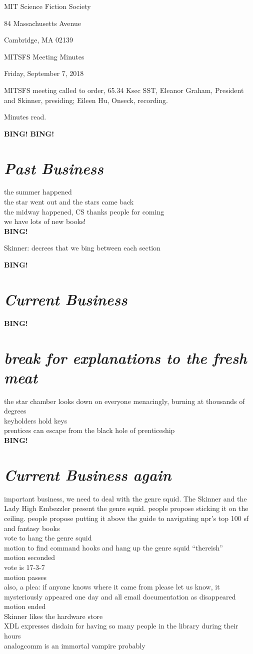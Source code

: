 \documentclass[10pt]{article}
\newcommand{\bing}{{\bf BING!} }
\newcommand{\goto}[1]{\bing \vskip 12pt \section*{{\em{#1}}}}
\newcommand{\skinner}{Eleanor Graham, President and Skinner}
\newcommand{\onseck}{Eileen Hu, Onseck}
\newcommand{\meetingdate}{Friday, September 7, 2018 }
\begin{document}
\begin{center}

MIT Science Fiction Society

84 Massachusetts Avenue

Cambridge, MA 02139

\vspace{12pt}

MITSFS Meeting Minutes

\meetingdate

\end{center}

\vspace{18pt}

\setlength{\parskip}{6pt}

\noindent
MITSFS meeting called to order, 65.34 Ksec SST,
\skinner, presiding; \onseck, recording.

Minutes read.

\bing
\goto{Past Business}
the summer happened \\
the star went out and the stars came back \\
the midway happened, CS thanks people for coming \\
we have lots of new books! \\

\bing

Skinner: decrees that we bing between each section

\goto{Current Business}

\goto{break for explanations to the fresh meat}
the star chamber looks down on everyone menacingly, burning at thousands of degrees \\
keyholders hold keys \\
prentices can escape from the black hole of prenticeship \\

\goto {Current Business again}
important business, we need to deal with the genre squid. The Skinner and the Lady High Embezzler present the genre squid. people propose sticking it on the ceiling. people propose putting it above the guide to navigating npr’s top 100 sf and fantasy books \\
vote to hang the genre squid \\
motion to find command hooks and hang up the genre squid “thereish” \\
motion seconded \\
vote is 17-3-7 \\
motion passes \\
also, a plea: if anyone knows where it came from please let us know, it mysteriously appeared one day and all email documentation as disappeared \\
motion ended \\
Skinner likes the hardware store \\
XDL expresses disdain for having so many people in the library during their hours \\
analogcomm is an immortal vampire probably \\
\end{document}
